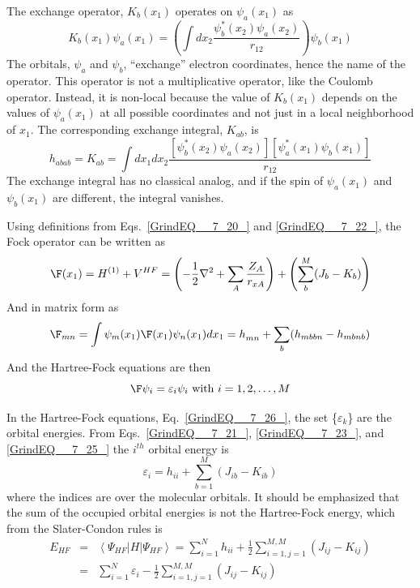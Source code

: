 \documentclass[11pt,oneside,final]{huthesis}%
\begin{document}
 The exchange operator, $K_{b} (x_{1} )$ operates on $\psi _{a} (x_{1} )$ as
\begin{equation} \label{GrindEQ__7_23_} 
K_{b} (x_{1} )\psi _{a} (x_{1} )=\left(\int dx_{2} \frac{\psi _{b}^{*} (x_{2} )\psi _{a} (x_{2} )}{r_{12} }  \right)\psi _{b} (x_{1} )
\end{equation} 
The orbitals, $\psi _{a} $ and $\psi _{b}$, ``exchange'' electron coordinates, hence the name of the operator.   This operator is not  a multiplicative operator, like the Coulomb operator.   Instead, it is {non-local} because the value of $K_b(x_1)$ depends on the values of $\psi _{a} (x_{1} )$ at all possible coordinates and not just in a local neighborhood of ${x}_{1}$. The corresponding exchange integral, $K_{ab}$, is
\begin{equation} \label{GrindEQ__7_24_} 
h_{abab} =K_{ab} =\int dx_{1} dx_{2} \frac{[\psi _{b}^{*} (x_{2} )\psi _{a} (x_{2} )][\psi _{a}^{*} (x_{1} )\psi _{b} (x_{1} )]}{r_{12} } 
\end{equation} 
The exchange integral has no classical analog, and if the spin of $\psi _{a} (x_{1} )$ and $\psi _{b} (x_{1} )$ are different, the integral vanishes.  

Using definitions from Eqs.~\eqref{GrindEQ__7_20_} and \eqref{GrindEQ__7_22_}, the Fock operator can be written as
\begin{equation} \label{GrindEQ__7_25_} 
\F(x_{1} )=H^{(1)} +V^{HF} =\left(-\frac{1}{2} \nabla ^{2} +\sum_{A}\frac{Z_{A} }{r_{xA} }  \right)+\left(\sum_{b}^M (J_{b} -K_{b})  \right) 
\end{equation} 
And in matrix form as
\[\F_{mn} =\int \psi _{m} (x_{1} )\F(x_{1} )\psi _{n} (x_{1} )dx_{1}  =h_{mn}^{} +\sum _{b}(h_{mbbn} -h_{mbnb})  \] 
And the Hartree-Fock equations are then
\begin{equation}
\F\psi _{i} =\varepsilon _{i} \psi _{i}  \textrm{   with    } i=1,2,\dots ,M     
\label{GrindEQ__7_26_}
\end{equation}


In the Hartree-Fock equations, Eq.~\eqref{GrindEQ__7_26_}, the set \{$\varepsilon _{k} $\} are the orbital energies.  From Eqs.~\eqref{GrindEQ__7_21_}, \eqref{GrindEQ__7_23_}, and \eqref{GrindEQ__7_25_} the ${i}^{th}$ orbital energy is
\begin{equation} \label{GrindEQ__7_27_} 
\varepsilon _{i} =h_{ii}^{} +\sum _{b=1}^{M}\left(J_{ib} -K_{ib}   \right)
\end{equation} 
where the indices are over the molecular orbitals. It should be emphasized that the sum of the occupied orbital energies is not the Hartree-Fock energy, which from the Slater-Condon rules is
\begin{eqnarray} \label{GrindEQ__7_28_} 
E_{HF}&=&\left\langle \Psi_{HF} |H|\Psi_{HF} \right\rangle =\sum_{i=1}^N h_{ii}  +\frac{1}{2} \sum_{i=1,j=1}^{M,M}(J_{ij} -K_{ij} )\nonumber\\
&=&\sum_{i=1}^N\varepsilon _{i} -\frac{1}{2} \sum_{i=1,j=1}^{M,M}(J_{ij} -K_{ij} )  
\end{eqnarray} 
\end{document}
